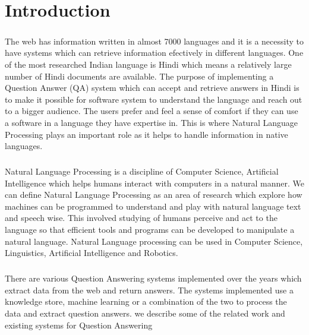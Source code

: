 \chapter{Introduction}

\paragraph{}
The web has information written in almost 7000 languages and it is a necessity to have systems which can retrieve information efectively in different languages. One of the most researched Indian language is Hindi which means a relatively large number of Hindi documents are available. The purpose of implementing a Question Answer (QA) system which can accept and retrieve answers in Hindi is to make it possible for software system to understand the language and reach out to a bigger audience. The users prefer and feel a sense of comfort if they can use a software in a language they have expertise in. This is where Natural Language Processing \cite{chowdhury2003natural} plays an important role as it helps to handle information in native languages.

\paragraph{}
Natural Language Processing is a discipline of Computer Science, Artificial Intelligence which helps humans interact with computers in a natural manner. We can define Natural Language Processing as an area of research which explore how machines can be programmed to understand and play with natural language text and speech wise. This involved studying of humans perceive and act to the language so that efficient tools and programs can be developed to manipulate a natural language. Natural Language processing can be used in Computer Science, Linguistics, Artificial Intelligence and Robotics. 

\paragraph{}
There are various Question Answering systems implemented over the years which extract data from the web and return answers. The systems implemented use a knowledge store, machine learning or a combination of the two to process the data and extract question answers. we describe some of the related work and existing systems for Question Answering 

